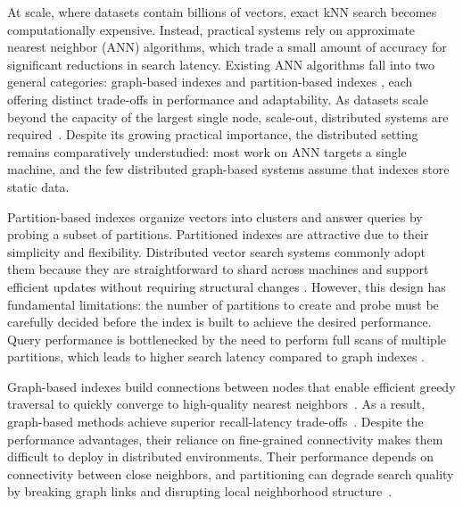 \documentclass[sigconf,review,anonymous]{acmart}
\begin{document}
At scale, where datasets contain billions of vectors, exact kNN search becomes computationally expensive. Instead, practical systems rely on approximate nearest neighbor (ANN) algorithms, which trade a small amount of accuracy for significant reductions in search latency. Existing ANN algorithms fall into two general categories: graph-based indexes \cite{malkov2018efficient, jayaram2019diskann, wang2021comprehensive} and partition-based indexes \cite{jegou2011searching, baranchuk2018revisiting}, each offering distinct trade-offs in performance and adaptability. As datasets scale beyond the capacity of the largest single node, scale-out, distributed systems are required~\cite{deng2019pyramid, chen2021spann, xu2023spfresh, mohoney2025quake, gottensuren2025unleashing}. Despite its growing practical importance, the distributed setting remains comparatively understudied: most work on ANN targets a single machine, and the few distributed graph-based systems assume that indexes store static data. %

Partition-based indexes organize vectors into clusters and answer queries by probing a subset of partitions. Partitioned indexes are attractive due to their simplicity and flexibility. Distributed vector search systems commonly adopt them because they are straightforward to shard across machines and support efficient updates without requiring structural changes \cite{chen2021spann, xu2023spfresh, mohoney2025quake}. However, this design has fundamental limitations: the number of partitions to create and probe must be carefully decided before the index is built to achieve the desired performance. Query performance is bottlenecked by the need to perform full scans of multiple partitions, which leads to higher search latency compared to graph indexes \cite{wang2021comprehensive, aumuller2020ann, li2020annsurvey}.

Graph-based indexes build connections between nodes that enable efficient greedy traversal to quickly converge to high-quality nearest neighbors~\cite{malkov2018efficient, fu2019nsg, jayaram2019diskann}. As a result, graph-based methods achieve superior recall-latency trade-offs~\cite{li2020annsurvey, wang2021comprehensive, aumuller2020ann}. Despite the performance advantages, their reliance on fine-grained connectivity makes them difficult to deploy in distributed environments. Their performance depends on connectivity between close neighbors, and partitioning can degrade search quality by breaking graph links and disrupting local neighborhood structure~\cite{gottensuren2025unleashing, deng2019pyramid}.
\end{document}
